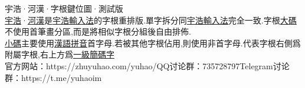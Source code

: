 \documentclass{ctexart}
\begin{document}
    \pagestyle{empty}
    \centering
    {
        \fontsize{32pt}{32pt}\selectfont 宇浩·河漢·字根鍵位圖·測試版\\[0.5cm]
    }
    {
        \fontsize{16pt}{16pt}\selectfont \uline{宇浩}·\uline{河漢}是\uline{宇浩輸入法}的字根重排版.單字拆分同\uline{宇浩輸入法}完全一致.字根\uline{大碼}不使用首筆畫分區,而是將相似字根分組後自由排佈.\\
        \uline{小碼}主要使用\uline{漢語拼音}首字母.若被其他字根佔用,則使用非首字母.代表字根右側爲附屬字根,右上方爲\uline{一級簡碼字} \\
        官方网站：https://zhuyuhao.com/yuhao/\hspace{1.5cm}QQ讨论群：735728797\hspace{1.5cm}Telegram讨论群：https://t.me/yuhaoim\\
            [0.5cm]
    }
\end{document}
